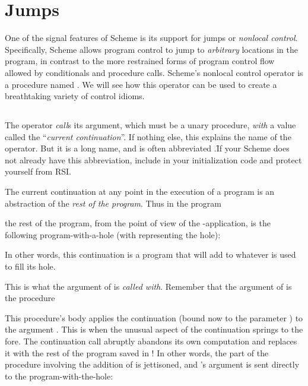 \chapter{Jumps}

One of the signal features of Scheme is its support for
jumps or {\em nonlocal control}.  Specifically, Scheme
allows program control to jump to {\em arbitrary}
locations in the program, in contrast to the more
restrained forms of program control flow allowed by
conditionals and procedure calls.  Scheme’s nonlocal
control operator is a procedure named
.   We will
see how this operator can be used to create a
breathtaking variety of control idioms.

\section{}

The operator  {\em
call}s its argument, which must be a unary procedure,
{\em with} a value called the “{\em current
continuation}”.  If nothing else, this explains the
name of the operator.  But it is a long name, and is
often abbreviated
.\f{If your Scheme does not already have this
abbreviation, include
 in
your initialization code and protect yourself from
RSI.}

The current continuation at any point in the execution
of a program is an abstraction of the {\em rest of the
program}.  Thus in the program


\n
the rest of the program, from the point of view of the
-application, is the following
program-with-a-hole (with \q{[]} representing the
hole):


\n
In other words, this continuation is a program that
will add  to whatever is used to fill its hole.

This is what the argument of  is {\em called
with}.  Remember that the argument of  is
the procedure


\n
This procedure’s body applies the continuation (bound
now to the parameter ) to the argument .
This is when the unusual aspect of the continuation
springs to the fore.  The continuation call abruptly
abandons its own computation and replaces it with the
rest of the program saved in !  In other words,
the part of the procedure involving the addition of
 is jettisoned, and ’s argument  is sent
directly to the program-with-the-hole:

